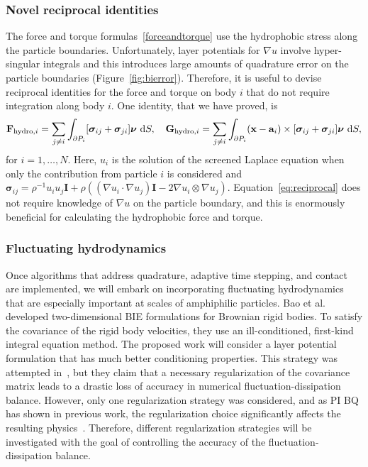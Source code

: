 \subsubsection{Novel reciprocal identities}
\label{subsec:reciprocal}
The force and torque formulas~\eqref{forceandtorque} use the
hydrophobic stress along the particle boundaries. Unfortunately,
layer potentials for $\nabla u$ involve hyper-singular integrals and
this introduces large amounts of quadrature error on the particle
boundaries (Figure~\ref{fig:bierror}). Therefore, it is useful to devise
reciprocal identities for the force and torque on body $i$ that do not
require integration along body $i$. One identity, that we have proved,
is
\begin{align}
    \label{eq:reciprocal}
{\bf F}_{\text{hydro},i} = \sum_{j \neq i} \int_{\partial P_i}[\boldsymbol{\sigma}_{ij} + \boldsymbol{\sigma}_{ji}]\boldsymbol{\nu}\,\dif S,\quad
{\bf G}_{\text{hydro},i} = \sum_{j \neq i} \int_{\partial P_i} ({\bf
  x}-\mathbf{a}_i) \times [\boldsymbol{\sigma}_{ij} +
  \boldsymbol{\sigma}_{ji}]\boldsymbol{\nu}\,\dif S, 
\end{align}
for $i=1,\ldots,N$. Here, $u_i$ is the solution of the screened Laplace
equation when only the contribution from particle $i$ is considered and
$\boldsymbol{\sigma}_{ij} = \rho^{-1} u_iu_j \mathbf{I} +
\rho\left((\nabla u_i \cdot \nabla u_j) \mathbf{I} - 2 \nabla u_i
\otimes \nabla u_j\right)$. Equation~\eqref{eq:reciprocal} does not
require knowledge of $\nabla u$ on the particle boundary, and this is
enormously beneficial for calculating the hydrophobic force and torque.

\subsubsection{Fluctuating hydrodynamics}
\label{subsec:fluctuating}
Once algorithms that address quadrature, adaptive time stepping, and
contact are implemented, we will embark on incorporating fluctuating
hydrodynamics that are especially important at scales of amphiphilic
particles. Bao et al.~\cite{Bao17,Bao18} developed two-dimensional BIE
formulations for Brownian rigid bodies. To satisfy the covariance of the
rigid body velocities, they use an ill-conditioned, first-kind integral
equation method. The proposed work will consider a layer potential
formulation that has much better conditioning properties. This strategy
was attempted in~\cite{Bao18}, but they claim that a necessary
regularization of the covariance matrix leads to a drastic loss of
accuracy in numerical fluctuation-dissipation balance. However, only one
regularization strategy was considered, and as PI BQ has shown in
previous work, the regularization choice significantly affects the
resulting physics~\cite{ong-chr-qua2017}. Therefore, different
regularization strategies will be investigated with the goal of
controlling the accuracy of the fluctuation-dissipation balance.


